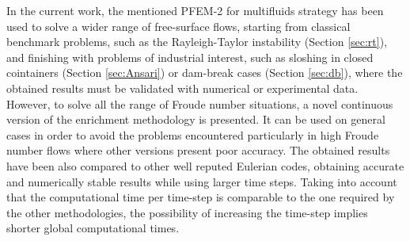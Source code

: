 In the current work, the mentioned PFEM-2 for multifluids strategy has been used to solve a wider range of free-surface flows, starting from classical benchmark problems, such as the Rayleigh-Taylor instability (Section \ref{sec:rt}), and finishing with problems of industrial interest, such as sloshing in closed cointainers (Section \ref{sec:Ansari}) or dam-break cases (Section \ref{sec:db}), where the obtained results must be validated with numerical or experimental data. However, to solve all the range of Froude number situations, a novel continuous version of the enrichment methodology is presented. It can be used on general cases in order to avoid the problems encountered particularly in high Froude number flows where other versions present poor accuracy. The obtained results have been also compared to other well reputed Eulerian codes, obtaining accurate and numerically stable results while using larger time steps. Taking into account that the computational time per time-step is comparable to the one required by the other methodologies, the possibility of increasing the time-step implies shorter global computational times.
